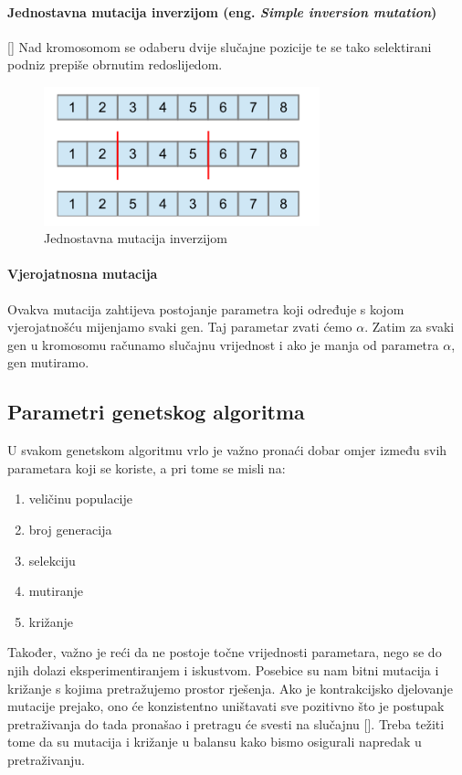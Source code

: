 \documentclass[times, utf8, zavrsni]{fer}
\begin{document}
	\paragraph{Jednostavna mutacija inverzijom (eng. \emph{Simple inversion mutation})}[\citep{Holland}]
	Nad kromosomom se odaberu dvije slučajne pozicije te se tako selektirani podniz prepiše obrnutim redoslijedom.
	
	
	\begin{figure}[!htb]
		\centering
		\includegraphics[width=8cm]{slike/SIM.png}
		\caption{Jednostavna mutacija inverzijom}
		\label{fig:inversion-mutation}
	\end{figure}
	
	\paragraph{Vjerojatnosna mutacija}
	
	Ovakva mutacija zahtijeva postojanje parametra koji određuje s kojom vjerojatnošću mijenjamo svaki gen. Taj parametar zvati ćemo \emph{$\alpha$}. Zatim za svaki gen u kromosomu računamo slučajnu vrijednost i ako je manja od parametra \emph{$\alpha$}, gen mutiramo. 
	
	\subsection{Parametri genetskog algoritma}
	
	U svakom genetskom algoritmu vrlo je važno pronaći dobar omjer između svih parametara koji se koriste, a pri tome se misli na:
	\begin{enumerate}
		\item veličinu populacije
		\item broj generacija
		\item selekciju
		\item mutiranje
		\item križanje
	\end{enumerate}
	
	Također, važno je reći da ne postoje točne vrijednosti parametara, nego se do njih dolazi eksperimentiranjem i iskustvom. Posebice su nam bitni mutacija i križanje s kojima pretražujemo prostor rješenja. Ako je kontrakcijsko djelovanje mutacije prejako, ono će konzistentno uništavati sve pozitivno što je postupak pretraživanja do tada pronašao i pretragu će svesti na slučajnu [\citep{UI}]. Treba težiti tome da su mutacija i križanje u balansu kako bismo osigurali napredak u pretraživanju. 
	
\end{document}
